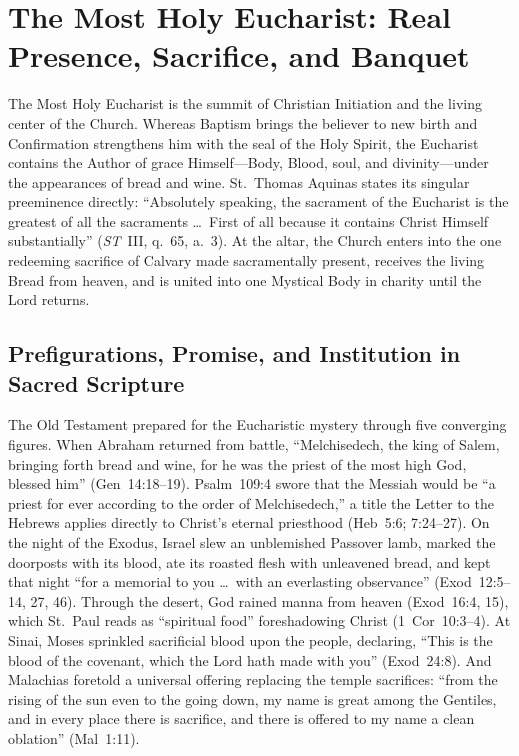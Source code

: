 \section{The Most Holy Eucharist: Real Presence, Sacrifice, and Banquet}
\label{sec:eucharist}

The Most Holy Eucharist is the summit of Christian Initiation and the living center of the Church. Whereas Baptism brings the believer to new birth and Confirmation strengthens him with the seal of the Holy Spirit, the Eucharist contains the Author of grace Himself---Body, Blood, soul, and divinity---under the appearances of bread and wine. St.~Thomas Aquinas states its singular preeminence directly: ``Absolutely speaking, the sacrament of the Eucharist is the greatest of all the sacraments \dots\ First of all because it contains Christ Himself substantially'' (\emph{ST}~III, q.~65, a.~3). At the altar, the Church enters into the one redeeming sacrifice of Calvary made sacramentally present, receives the living Bread from heaven, and is united into one Mystical Body in charity until the Lord returns.

\subsection{Prefigurations, Promise, and Institution in Sacred Scripture}
\label{subsec:eucharist-scripture}

The Old Testament prepared for the Eucharistic mystery through five converging figures. When Abraham returned from battle, ``Melchisedech, the king of Salem, bringing forth bread and wine, for he was the priest of the most high God, blessed him'' (Gen~14:18--19). Psalm~109:4 swore that the Messiah would be ``a priest for ever according to the order of Melchisedech,'' a title the Letter to the Hebrews applies directly to Christ's eternal priesthood (Heb~5:6; 7:24--27). On the night of the Exodus, Israel slew an unblemished Passover lamb, marked the doorposts with its blood, ate its roasted flesh with unleavened bread, and kept that night ``for a memorial to you \dots\ with an everlasting observance'' (Exod~12:5--14, 27, 46). Through the desert, God rained manna from heaven (Exod~16:4, 15), which St.~Paul reads as ``spiritual food'' foreshadowing Christ (1~Cor~10:3--4). At Sinai, Moses sprinkled sacrificial blood upon the people, declaring, ``This is the blood of the covenant, which the Lord hath made with you'' (Exod~24:8). And Malachias foretold a universal offering replacing the temple sacrifices: ``from the rising of the sun even to the going down, my name is great among the Gentiles, and in every place there is sacrifice, and there is offered to my name a clean oblation'' (Mal~1:11).

